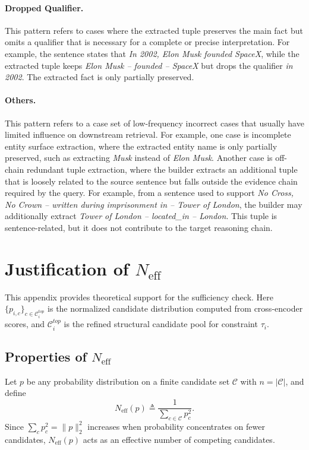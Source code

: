 \documentclass{article}
\theoremstyle{plain}
\theoremstyle{definition}
\theoremstyle{remark}
\begin{document}
\paragraph{Dropped Qualifier.}
This pattern refers to cases where the extracted tuple preserves the main fact but omits a qualifier that is necessary for a complete or precise interpretation.
For example, the sentence states that \emph{In 2002, Elon Musk founded SpaceX}, while the extracted tuple keeps \emph{Elon Musk -- founded -- SpaceX} but drops the qualifier \emph{in 2002}. The extracted fact is only partially preserved.

\paragraph{Others.}
This pattern refers to a case set of low-frequency incorrect cases that usually have limited influence on downstream retrieval.
For example, one case is incomplete entity surface extraction, where the extracted entity name is only partially preserved, such as extracting \emph{Musk} instead of \emph{Elon Musk}. Another case is off-chain redundant tuple extraction, where the builder extracts an additional tuple that is loosely related to the source sentence but falls outside the evidence chain required by the query.  For example, from a sentence used to support \emph{No Cross, No Crown -- written during imprisonment in -- Tower of London}, the builder may additionally extract \emph{Tower of London -- located\_in -- London}. This tuple is sentence-related, but it does not contribute to the target reasoning chain.
 
\section{Justification of $N_{\mathrm{eff}}$}
\label{app:neff}

This appendix provides theoretical support for the sufficiency check.
Here $\{p_{i,c}\}_{c\in\mathcal{C}_i^{top}}$ is the normalized candidate distribution computed from cross-encoder scores, and $\mathcal{C}_i^{top}$ is the refined structural candidate pool for constraint $\tau_i$.

\subsection{Properties of $N_{\mathrm{eff}}$}

Let $p$ be any probability distribution on a finite candidate set $\mathcal{C}$ with $n=|\mathcal{C}|$, and define
\begin{equation}
N_{\mathrm{eff}}(p) \triangleq \frac{1}{\sum_{c\in\mathcal{C}} p_c^2}.
\label{eq:app_neff_general}
\end{equation}
Since $\sum_{c} p_c^2=\|p\|_2^2$ increases when probability concentrates on fewer candidates, $N_{\mathrm{eff}}(p)$ acts as an effective number of competing candidates.
\end{document}
